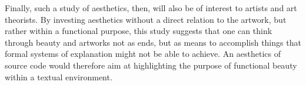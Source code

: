 Finally, such a study of aesthetics, then, will also be of interest to artists and art theorists. By investing aesthetics without a direct relation to the artwork, but rather within a functional purpose, this study suggests that one can think through beauty and artworks not as ends, but as means to accomplish things that formal systems of explanation might not be able to achieve. An aesthetics of source code would therefore aim at highlighting the purpose of functional beauty within a textual environment.
